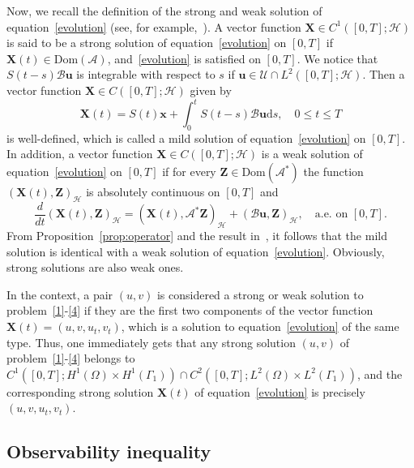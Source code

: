 \documentclass[10pt]{elsarticle}
\begin{document}
Now, we recall the definition of the strong and weak solution of equation~\eqref{evolution} (see, for example,~\cite[Chapter 4.2, pp. 105-109]{Pazy}). 
A vector function $\mathbf{X}\in C^1([0, T]; \mathcal{H})$ is said to be a strong solution of equation~\eqref{evolution} on $[0, T]$ if $\mathbf{X}(t)\in\mathrm{Dom}(\mathcal{A})$, and~\eqref{evolution} is satisfied on $[0, T]$. We notice that $S(t-s)\mathcal{B}\mathbf{ u}$ is integrable with respect to $s$ if $\mathbf{ u} \in \mathcal{U}\cap L^2([0, T]; \mathcal{H})$. Then a vector function $\mathbf{X}\in C([0, T]; \mathcal{H})$ given by
\[
\mathbf{X}(t)= S(t)\mathbf{ x} + \int_{0}^{t}S(t-s)\mathcal{B}\mathbf{ u}\mathrm{d}s, \quad 0\leqslant t \leqslant T
\]
is well-defined, which is called a mild solution of equation~\eqref{evolution} on $[0, T]$. In addition, a vector function $\mathbf{X}\in C([0, T]; \mathcal{H})$ is a weak solution of equation~\eqref{evolution} on $[0, T]$ if for every ${\mathbf{ Z}}\in\mathrm{Dom}(\mathcal{A}^{\ast})$ the function $(\mathbf{X}(t), {\mathbf{Z}})_{\mathcal{H}}$ is absolutely continuous on $[0, T]$ and
\[
\frac{d}{dt}(\mathbf{X}(t), {\mathbf{Z}})_{\mathcal{H}} = (\mathbf{X}(t), \mathcal{A}^{\ast}{\mathbf{Z}})_{\mathcal{H}} +(\mathcal{B}\mathbf{ u}, {\mathbf{Z}})_{\mathcal{H}}, \quad \textrm{a.e. on $[0, T]$}.
\]
From Proposition~\ref{prop:operator} and the result in~\cite{ball1977strongly}, it follows that the mild solution is identical with a weak solution of equation~\eqref{evolution}. Obviously, strong solutions are also weak ones. 

In the context, a pair $(u, v)$ is considered a strong or weak solution to problem~\eqref{1}-\eqref{4} if they are the first two components of the vector function $\mathbf{X}(t)=\left(u, v, u_t, v_t\right)$, which is a solution to equation~\eqref{evolution} of the same type. Thus, one immediately gets that any strong solution $(u, v)$ of problem~\eqref{1}-\eqref{4} belongs to $C^1([0, T]; H^1(\Omega)\times H^1(\Gamma_1))\cap C^2([0, T]; L^2(\Omega)\times L^2(\Gamma_1))$, and the corresponding strong solution $\mathbf{X}(t)$ of equation~\eqref{evolution} is precisely $\left(u, v, u_t, v_t\right)$.

\subsection{Observability inequality}
\label{subsec:observability}
\end{document}
